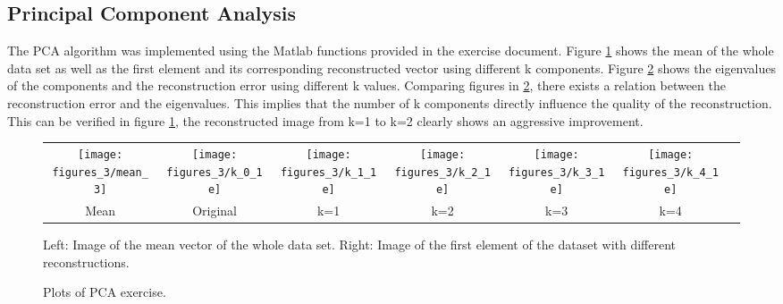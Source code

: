 \subsection{Principal Component Analysis}
The PCA algorithm was implemented using the Matlab functions provided in the exercise document. Figure \ref{3_333} shows the mean of the whole data set as well as the first element and its corresponding reconstructed vector using different k components. Figure  \ref{eigenvqlues_plot} shows the eigenvalues of the components and the reconstruction error using different k values.
\bigbreak
Comparing figures in \ref{eigenvqlues_plot}, there exists a relation between the reconstruction error and the eigenvalues. This implies that the number of k components directly influence the quality of the reconstruction. This can be verified in figure  \ref{3_333}, the reconstructed image from k=1 to k=2 clearly shows an aggressive improvement.

\begin{figure}[!htbp]
\caption{Left: Image of the mean vector of the whole data set. Right: Image of the first element of the dataset with different reconstructions.}
\label{3_333}
\medbreak
\begin{tabular}{ccccccc}
\texttt{[image: figures\_3/mean\_3]} &
\texttt{[image: figures\_3/k\_0\_1e]} &
\texttt{[image: figures\_3/k\_1\_1e]} &
\texttt{[image: figures\_3/k\_2\_1e]} &
\texttt{[image: figures\_3/k\_3\_1e]} &
\texttt{[image: figures\_3/k\_4\_1e]}\\
 Mean & Original & k=1 & k=2 & k=3 & k=4\\
\end{tabular}
\centering
\end{figure}


\begin{figure}[!htbp]
\caption{Plots of PCA exercise.}
\label{eigenvqlues_plot}
  \centering
  \label{eigenvqlues_plot}
  \hfill
\end{figure}


